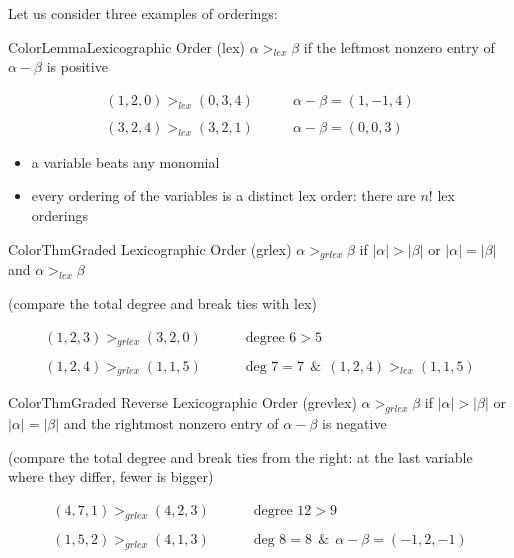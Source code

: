 \documentclass[a4paper, 11pt]{report}
\begin{document}
Let us consider three examples of orderings:

\begin{cframe}{ColorLemma}{Lexicographic Order (lex)}
    $\alpha >_{lex} \beta$ if the leftmost nonzero entry of $\alpha - \beta$ is positive

    \begin{gframe}{}
        \vspace{-1em}
    \begin{align*}
        (1, 2, 0) >_{lex} (0, 3, 4)\quad \quad & \alpha-\beta = (1, -1, 4) \\\\
        (3, 2, 4) >_{lex} (3, 2, 1)\quad \quad & \alpha - \beta = (0, 0, 3)
    \end{align*}
\end{gframe}

\begin{itemize}
    \item a variable beats any monomial
    \item every ordering of the variables is a distinct lex order: there are $n!$ lex orderings
\end{itemize}
\end{cframe}


\begin{cframe}{ColorThm}{Graded Lexicographic Order (grlex)}
    $\alpha >_{grlex} \beta$ if $|\alpha| > |\beta|$ or $|\alpha| = |\beta|$ and $\alpha >_{lex} \beta$

    (compare the total degree and break ties with lex)
    \begin{gframe}{}
        \vspace{-1em}
    \begin{align*}
        (1, 2, 3) >_{grlex} (3, 2, 0)\quad \quad &  \text{ degree } 6> 5 \\\\
    (1, 2, 4) >_{grlex} (1,1,5) \quad\quad & \text{ deg } 7 =7 \ \ \& \ \  (1, 2, 4) >_{lex} (1,1,5)  \end{align*}
\end{gframe}

\end{cframe}


\begin{cframe}{ColorThm}{Graded Reverse Lexicographic Order (grevlex)}
    $\alpha >_{grlex} \beta$ if $|\alpha| > |\beta|$ or $|\alpha| = |\beta|$ and the rightmost nonzero entry of $\alpha - \beta$ is negative

    (compare the total degree and break ties from the right: at the last variable where they differ, fewer is bigger)
    \begin{gframe}{}
        \vspace{-1em}
    \begin{align*}
        (4, 7, 1) >_{grlex} (4, 2, 3)\quad \quad &  \text{ degree } 12> 9 \\\\
    (1, 5, 2) >_{grlex} (4,1,3) \quad\quad & \text{ deg } 8 =8 \ \ \& \ \  \alpha - \beta = (-1, 2, -1) 
\end{align*}
\end{gframe}

\end{cframe}
\end{document}
